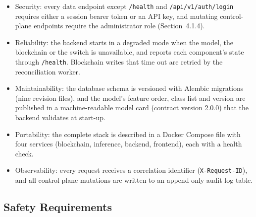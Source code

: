 \documentclass[12pt,a4paper]{report}
\begin{document}
\begin{itemize}
    \item {Security: every data endpoint except \texttt{/health} and \texttt{/api/v1/auth/login} requires either a session bearer token or an API key, and mutating control-plane endpoints require the administrator role (Section~4.1.4).}

    \item {Reliability: the backend starts in a degraded mode when the model, the blockchain or the switch is unavailable, and reports each component's state through \texttt{/health}. Blockchain writes that time out are retried by the reconciliation worker.}

    \item {Maintainability: the database schema is versioned with Alembic migrations (nine revision files), and the model's feature order, class list and version are published in a machine-readable model card (contract version 2.0.0) that the backend validates at start-up.}

    \item {Portability: the complete stack is described in a Docker Compose file with four services (blockchain, inference, backend, frontend), each with a health check.}

    \item {Observability: every request receives a correlation identifier (\texttt{X-Request-ID}), and all control-plane mutations are written to an append-only audit log table.}
\end{itemize}

\subsection{Safety Requirements}
\end{document}
